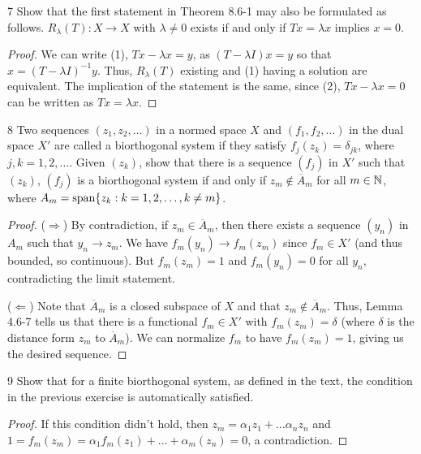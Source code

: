 \begin{exercise}{7}
Show that the first statement in Theorem 8.6-1 may also be formulated as follows.
$R_\lambda(T): X \to X$ with $\lambda \neq 0$ exists if and only if $Tx = \lambda x$ implies $x = 0$.
\end{exercise}
\begin{proof}
We can write (1), $T x - \lambda x = y$, as $(T - \lambda I)x = y$ so that $x = (T - \lambda I)^{-1} y$.
Thus, $R_\lambda(T)$ existing and (1) having a solution are equivalent.
The implication of the statement is the same, since (2), $T x - \lambda x = 0$ can be written as $T x = \lambda x$.
\end{proof} 

\begin{exercise}{8}
Two sequences $(z_1, z_2, \dots)$ in a normed space $X$ and $(f_1, f_2, \dots)$ in the dual space $X'$ are called a biorthogonal system if they satisfy $f_j(z_k) = \delta_{jk}$, where $j, k = 1, 2, \dots$.
Given $(z_k)$, show that there is a sequence $(f_j)$ in $X'$ such that $(z_k)$, $(f_j)$ is a biorthogonal system if and only if $z_m \notin \overline{A}_m$ for all $m \in \mathbb{N}$, where $A_m = \operatorname*{span} \{z_k: k = 1, 2, \dots, k \neq m\}$.
\end{exercise}
\begin{proof}
($\Rightarrow$) 
By contradiction, if $z_m \in \overline{A}_m$, then there exists a sequence $(y_n)$ in $A_m$ such that $y_n \to z_m$.
We have $f_m(y_n) \to f_m(z_m)$ since $f_m \in X'$ (and thus bounded, so continuous).
But $f_m(z_m) = 1$ and $f_m(y_n) = 0$ for all $y_n$, contradicting the limit statement.

($\Leftarrow$)
Note that $\overline{A}_m$ is a closed subspace of $X$ and that $z_m \notin \overline{A}_m$.
Thus, Lemma 4.6-7 tells us that there is a functional $f_m \in X'$ with $f_m(z_m) = \delta$ (where $\delta$ is the distance form $z_m$ to $\overline{A}_m$).
We can normalize $f_m$ to have $f_m(z_m) = 1$, giving us the desired sequence.
\end{proof} 

\begin{exercise}{9}
Show that for a finite biorthogonal system, as defined in the text, the condition in the previous exercise is automatically satisfied.
\end{exercise}
\begin{proof}
If this condition didn't hold, then $z_m = \alpha_1 z_1 + \dots \alpha_n z_n$ and $1 = f_m(z_m) = \alpha_1 f_m(z_1) + \dots + \alpha_m(z_n) = 0$, a contradiction.
\end{proof} 

